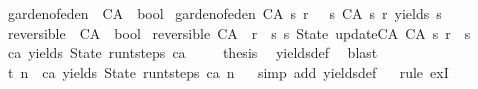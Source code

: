 \begin{isabellebody}
\isamarkupfalse%
\ garden{\isacharunderscore}of{\isacharunderscore}eden\ {\isacharcolon}{\isacharcolon}\ {\isachardoublequoteopen}CA\ {\isasymRightarrow}\ bool{\isachardoublequoteclose}\ \isanewline
{\isachardoublequoteopen}garden{\isacharunderscore}of{\isacharunderscore}eden\ {\isacharparenleft}CA\ s\ r{\isacharparenright}\ {\isacharequal}\ {\isacharparenleft}{\isasymnot}{\isacharparenleft}{\isasymexists}\ s{}{\isachardot}\ {\isacharparenleft}CA\ s{}\ r{\isacharparenright}\ yields\ s{\isacharparenright}{\isacharparenright}{\isachardoublequoteclose}\isanewline
\isanewline
{}\isamarkupfalse%
\ reversible\ {\isacharcolon}{\isacharcolon}\ {\isachardoublequoteopen}CA\ {\isasymRightarrow}\ bool{\isachardoublequoteclose}\ \isanewline
{\isachardoublequoteopen}reversible\ {\isacharparenleft}CA\ {\isacharunderscore}\ r{\isacharparenright}\ {\isacharequal}\ {\isacharparenleft}{\isasymforall}s{\isachardot}\ {\isacharparenleft}{\isasymexists}{\isacharbang}s{}{\isachardot}\ State\ {\isacharparenleft}update{\isacharunderscore}CA\ {\isacharparenleft}CA\ s{}\ r{\isacharparenright}{\isacharparenright}\ {\isacharequal}\ s{\isacharparenright}{\isacharparenright}{\isachardoublequoteclose}\isanewline
\isanewline
{}\isamarkupfalse%
\ {\isachardoublequoteopen}ca\ yields\ State\ {\isacharparenleft}run{\isacharunderscore}t{\isacharunderscore}steps\ ca\ {}{\isacharparenright}{\isachardoublequoteclose}\isanewline
%
\isadelimproof
%
\endisadelimproof
%
\isatagproof
{}\isamarkupfalse%
{\isacharminus}\isanewline
\ \ \isamarkupfalse%
\ {\isacharquery}thesis\ \isamarkupfalse%
\ yields{\isacharunderscore}def\ \isamarkupfalse%
\ blast\isanewline
{}\isamarkupfalse%
%
\endisatagproof
{\isafoldproof}%
%
\isadelimproof
\isanewline
%
\endisadelimproof
\isanewline
{}\isamarkupfalse%
\ t{}\ {\isacharcolon}{\isachardoublequoteopen}n{\isachargreater}{}\ {\isasymLongrightarrow}\ ca\ yields\ State\ {\isacharparenleft}run{\isacharunderscore}t{\isacharunderscore}steps\ ca\ n{\isacharparenright}{\isachardoublequoteclose}\isanewline
%
\isadelimproof
\ \ %
\endisadelimproof
%
\isatagproof
{}\isamarkupfalse%
{\isacharparenleft}simp\ add{\isacharcolon}\ yields{\isacharunderscore}def{\isacharparenright}\isanewline
\ \ \isamarkupfalse%
{\isacharparenleft}rule\ exI{\isacharparenright}\isanewline
\ \ \isamarkupfalse%

\end{isabellebody}
